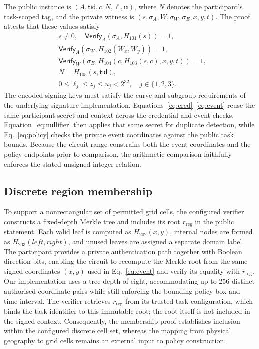 \documentclass[pdflatex,iicol,sn-mathphys-num]{sn-jnl}
\begin{document}
The public instance is $(A,\mathsf{tid},c,N,\boldsymbol{\ell},\boldsymbol u)$, where $N$ denotes the participant's task-scoped tag, and the private witness is $(s,\sigma_A,W,\sigma_W,\sigma_E,x,y,t)$. The proof attests that these values satisfy
\begin{align}
 &s\ne 0, \quad \mathsf{Verify}_A(\sigma_A,H_{101}(s))=1,\label{eq:cred}\\
 &\mathsf{Verify}_A(\sigma_W,H_{102}(W_x,W_y))=1,\label{eq:issuer}\\
 &\mathsf{Verify}_W\!\left(\sigma_E,H_{104}(c,H_{103}(s,c),x,y,t)\right)=1,\label{eq:event}\\
 &N=H_{105}(s,\mathsf{tid}),\label{eq:nullifier}\\
 &0\leq \ell_j\leq z_j\leq u_j<2^{32},\quad j\in\{1,2,3\}.
 \label{eq:policy}
\end{align}
The encoded signing keys must satisfy the curve and subgroup requirements of the underlying signature implementation. Equations~\eqref{eq:cred}--\eqref{eq:event} reuse the same participant secret and context across the credential and event checks. Equation~\eqref{eq:nullifier} then applies that same secret for duplicate detection, while Eq.~\eqref{eq:policy} checks the private event coordinates against the public task bounds. Because the circuit range-constrains both the event coordinates and the policy endpoints prior to comparison, the arithmetic comparison faithfully enforces the stated unsigned integer relation.

\subsection{Discrete region membership}
To support a nonrectangular set of permitted grid cells, the configured verifier constructs a fixed-depth Merkle tree and includes its root $r_{\mathrm{reg}}$ in the public statement. Each valid leaf is computed as $H_{202}(x,y)$, internal nodes are formed as $H_{203}(\mathit{left},\mathit{right})$, and unused leaves are assigned a separate domain label. The participant provides a private authentication path together with Boolean direction bits, enabling the circuit to recompute the Merkle root from the same signed coordinates $(x,y)$ used in Eq.~\eqref{eq:event} and verify its equality with $r_{\mathrm{reg}}$. Our implementation uses a tree depth of eight, accommodating up to 256 distinct authorised coordinate pairs while still enforcing the bounding policy box and time interval. The verifier retrieves $r_{\mathrm{reg}}$ from its trusted task configuration, which binds the task identifier to this immutable root; the root itself is not included in the signed context. Consequently, the membership proof establishes inclusion within the configured discrete cell set, whereas the mapping from physical geography to grid cells remains an external input to policy construction.
\end{document}
